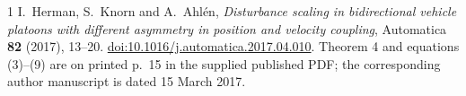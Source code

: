 \documentclass[11pt,letterpaper]{article}
\begin{document}
\begin{thebibliography}{1}
I.~Herman, S.~Knorn and A.~Ahl\'en,
\emph{Disturbance scaling in bidirectional vehicle platoons with different
asymmetry in position and velocity coupling},
Automatica \textbf{82} (2017), 13--20.
\href{https://doi.org/10.1016/j.automatica.2017.04.010}
{doi:10.1016/j.automatica.2017.04.010}.
Theorem 4 and equations (3)--(9) are on printed p.~15 in the supplied
published PDF; the corresponding author manuscript is dated 15 March 2017.
\end{thebibliography}
\end{document}
